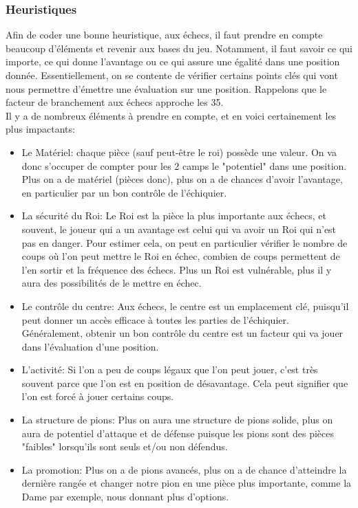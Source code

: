\documentclass{article}
\begin{document}
\subsubsection{Heuristiques}
Afin de coder une bonne heuristique, aux échecs, il faut prendre en compte beaucoup d'éléments et revenir aux bases du jeu.
Notamment, il faut savoir ce qui importe, ce qui donne l'avantage ou ce qui assure une égalité dans une position donnée. Essentiellement,
on se contente de vérifier certains points clés qui vont nous permettre d'émettre une évaluation sur une position.
Rappelons que le facteur de branchement aux échecs approche les 35.\\
Il y a de nombreux éléments à prendre en compte, et en voici certainement les plus impactants:
\begin{itemize}
    \item Le Matériel: chaque pièce (sauf peut-être le roi) possède une valeur. On va donc s'occuper de compter pour les 2 camps le "potentiel"
    dans une position. Plus on a de matériel (pièces donc), plus on a de chances d'avoir l'avantage, en particulier par un bon contrôle de l'échiquier.
    \item La sécurité du Roi: Le Roi est la pièce la plus importante aux échecs, et souvent, le joueur qui a un avantage est celui qui va
    avoir un Roi qui n'est pas en danger. Pour estimer cela, on peut en particulier vérifier le nombre de coups où l'on peut mettre le Roi en échec,
    combien de coups permettent de l'en sortir et la fréquence des échecs. Plus un Roi est vulnérable, plus il y aura des possibilités
    de le mettre en échec.
    \item Le contrôle du centre: Aux échecs, le centre est un emplacement clé, puisqu'il peut donner un accès efficace à toutes les parties de
    l'échiquier. Généralement, obtenir un bon contrôle du centre est un facteur qui va jouer dans l'évaluation d'une position.
    \item L'activité: Si l'on a peu de coups légaux que l'on peut jouer, c'est très souvent parce que l'on est en position de désavantage. Cela peut
    signifier que l'on est forcé à jouer certains coups.
    \item La structure de pions: Plus on aura une structure de pions solide, plus on aura de potentiel d'attaque et de défense puisque les pions sont
    des pièces "faibles" lorsqu'ils sont seuls et/ou non défendus.
    \item La promotion: Plus on a de pions avancés, plus on a de chance d'atteindre la dernière rangée et changer notre pion en une pièce plus importante,
    comme la Dame par exemple, nous donnant plus d'options.\\
\end{itemize}
\end{document}
